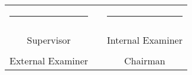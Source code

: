 %
\begin{center}
	\begin{tabular}{ccc}
		\rule{60mm}{0pt}        & \rule{10mm}{0pt}       & \rule{60mm}{0pt} \\
		\dotfill                &                        & \dotfill \\
		Supervisor              &                        & Internal Examiner \vspace{2cm} \\
		\dotfill                &                        & \dotfill \\
		External Examiner       &                        & Chairman \vspace{2cm} \\
	\end{tabular}    
\end{center}


